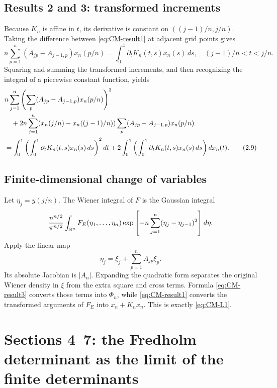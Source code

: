 \subsection{Results 2 and 3: transformed increments}
Because \(K_n\) is affine in \(t\), its derivative is constant on \(((j-1)/n,j/n)\).  Taking the difference between \eqref{eq:CM-result1} at adjacent grid points gives
\begin{equation}
 n\sum_{p=1}^n(A_{jp}-A_{j-1,p})x_n(p/n)
 =\int_0^1\partial_tK_n(t,s)x_n(s)\,ds,
 \quad (j-1)/n<t<j/n.
 \tag{2.5}\label{eq:CM-result2}
\end{equation}
Squaring and summing the transformed increments, and then recognizing the integral of a piecewise constant function, yields
\begin{align}
 &n\sum_{j=1}^n\left(\sum_p(A_{jp}-A_{j-1,p})x_n(p/n)\right)^2\\
 &\quad+2n\sum_{j=1}^n(x_n(j/n)-x_n((j-1)/n))
       \sum_p(A_{jp}-A_{j-1,p})x_n(p/n)\notag\\
 &=\int_0^1\left(\int_0^1\partial_tK_n(t,s)x_n(s)\,ds\right)^2dt
 +2\int_0^1\left(\int_0^1\partial_tK_n(t,s)x_n(s)\,ds\right)dx_n(t).
 \tag{2.9}\label{eq:CM-result3}
\end{align}

\subsection{Finite-dimensional change of variables}
Let \(\eta_j=y(j/n)\).  The Wiener integral of \(F\) is the Gaussian integral
\[
 \frac{n^{n/2}}{\pi^{n/2}}
 \int_{\mathbb{R}^n}F_E(\eta_1,\ldots,\eta_n)
 \exp\left[-n\sum_{j=1}^n(\eta_j-\eta_{j-1})^2\right]d\eta.
\]
Apply the linear map
\begin{equation}
 \eta_j=\xi_j+\sum_{p=1}^nA_{jp}\xi_p.
 \tag{2.10}\label{eq:CM-TE}
\end{equation}
Its absolute Jacobian is \(|A_n|\).  Expanding the quadratic form separates the original Wiener density in \(\xi\) from the extra square and cross terms.  Formula \eqref{eq:CM-result3} converts those terms into \(\Phi_n\), while \eqref{eq:CM-result1} converts the transformed arguments of \(F_E\) into \(x_n+K_nx_n\).  This is exactly \eqref{eq:CM-L1}.

\section{Sections 4--7: the Fredholm determinant as the limit of the finite determinants}


